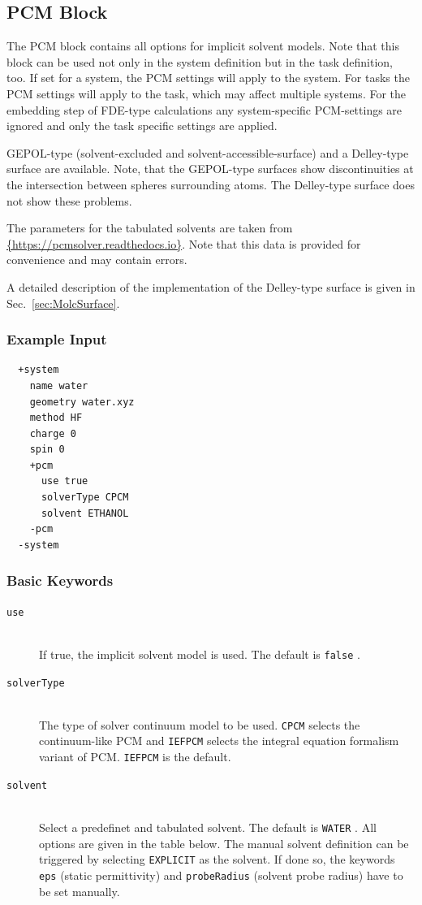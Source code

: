 \documentclass[bibliography=totocnumbered,a4paper,10pt,oneside]{scrbook}
\newcommand{\ttt}[1]{%
  \begingroup\setlength{\fboxsep}{1pt}%
  \colorbox{serenity-green!30}{\texttt{\hspace*{2pt}\vphantom{(g}#1\hspace*{2pt}}}%
  \endgroup
}
\begin{document}
\subsection{PCM Block}\label{sec:system:pcm}

The PCM block contains all options for implicit solvent models. Note that this block can
be used not only in the system definition but in the task definition, too. If set for
a system, the PCM settings will apply to the system. For tasks the PCM settings will apply
to the task, which may affect multiple systems. For the embedding step of FDE-type
calculations any system-specific PCM-settings are ignored and only the task specific settings
are applied.

GEPOL-type\cite{Pascual-Ahuir1987} (solvent-excluded and solvent-accessible-surface) and
a Delley-type\cite{Delley2006} surface are available. Note, that the GEPOL-type surfaces
show discontinuities at the intersection between spheres surrounding atoms. The Delley-type
surface does not show these problems.

The parameters for the tabulated solvents are taken from
\url{{https://pcmsolver.readthedocs.io}}.
Note that this data is provided for convenience and may contain errors.

A detailed description of the implementation of the Delley-type surface is given in Sec.~\ref{sec:MolcSurface}.
\subsubsection{Example Input}
\begin{lstlisting}
  +system
    name water  
    geometry water.xyz
    method HF  
    charge 0
    spin 0
    +pcm 
      use true
      solverType CPCM 
      solvent ETHANOL
    -pcm 
  -system
 \end{lstlisting}
\subsubsection{Basic Keywords}
\begin{description}
  \item [\texttt{use}]\hfill \\
  If true, the implicit solvent model is used. The default is \ttt{false}.
 \item [\texttt{solverType}]\hfill \\
 The type of solver continuum model to be used. \ttt{CPCM} selects the continuum-like PCM and 
 \ttt{IEFPCM} selects the integral equation formalism variant of PCM. \ttt{IEFPCM} is the default.
 \item [\texttt{solvent}]\hfill \\
 Select a predefinet and tabulated solvent. The default is \ttt{WATER}. All options are given in the table below.
 The manual solvent definition can be triggered by selecting \ttt{EXPLICIT} as the solvent. If done so, the keywords 
 \ttt{eps} (static permittivity) and \ttt{probeRadius} (solvent probe radius) have to be set manually.
\end{description}
\end{document}
